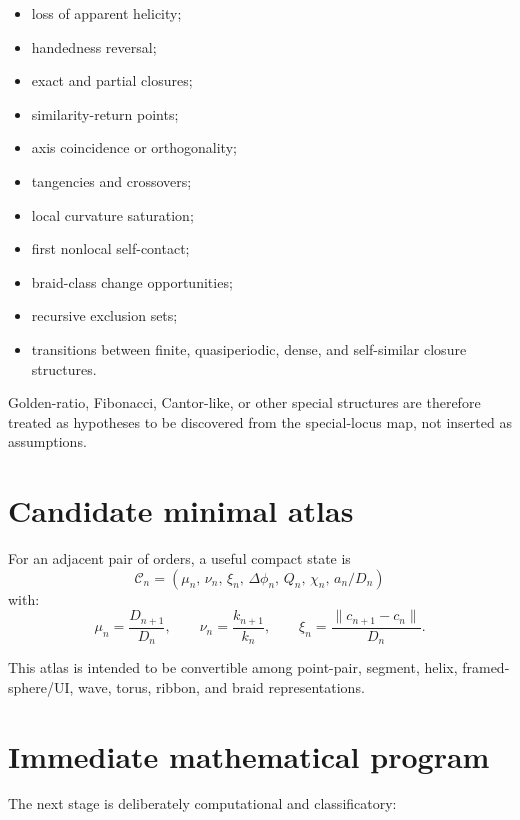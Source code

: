 \documentclass[11pt]{article}
\begin{document}
\begin{itemize}
    \item loss of apparent helicity;
    \item handedness reversal;
    \item exact and partial closures;
    \item similarity-return points;
    \item axis coincidence or orthogonality;
    \item tangencies and crossovers;
    \item local curvature saturation;
    \item first nonlocal self-contact;
    \item braid-class change opportunities;
    \item recursive exclusion sets;
    \item transitions between finite, quasiperiodic, dense, and self-similar
          closure structures.
\end{itemize}

Golden-ratio, Fibonacci, Cantor-like, or other special structures are therefore
treated as hypotheses to be discovered from the special-locus map, not inserted
as assumptions.

\section{Candidate minimal atlas}

For an adjacent pair of orders, a useful compact state is
\[
\boxed{
\mathcal C_n
=
\left(
\mu_n,\,
\nu_n,\,
\xi_n,\,
\Delta\phi_n,\,
Q_n,\,
\chi_n,\,
a_n/D_n
\right)
}
\]
with:
\[
\mu_n=\frac{D_{n+1}}{D_n},
\qquad
\nu_n=\frac{k_{n+1}}{k_n},
\qquad
\xi_n=\frac{\|c_{n+1}-c_n\|}{D_n}.
\]

This atlas is intended to be convertible among point-pair, segment, helix,
framed-sphere/UI, wave, torus, ribbon, and braid representations.

\section{Immediate mathematical program}

The next stage is deliberately computational and classificatory:
\end{document}
